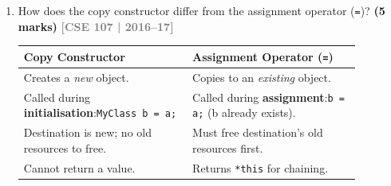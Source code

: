 \documentclass[12pt,a3paper]{article}
\newcommand{\yr}[1]{\hfill\textcolor{gray}{\small\textbf{[#1]}}}
\newcommand{\mk}[1]{\textcolor{orange!70!black}{\small\textbf{(#1 marks)}}}
\begin{document}
\begin{enumerate}
\begin{tcolorbox}[enhanced,breakable,ansbox,colback=cE!4,colframe=cE,
  boxrule=0.8pt,arc=5pt,
  title={\textbf{Answer --- myClass ob[] = \{-1, -2\} --- valid?}},
  fonttitle=\bfseries\color{white},colbacktitle=cE]
\textbf{Valid} --- if \texttt{myClass} has a single-\texttt{int}
constructor.

\begin{lstlisting}[language=C++]
class myClass {
    int val;
public:
    myClass(int v): val(v){}
    int get() const { return val; }
};

myClass ob[] = {-1, -2};
// Equivalent to: myClass ob[2] = {myClass(-1), myClass(-2)};
// ob[0].get() = -1,  ob[1].get() = -2
\end{lstlisting}

Each element in the initialiser list is implicitly converted to a
\texttt{myClass} object using the single-\texttt{int} constructor.
If the constructor is \texttt{explicit} or does not exist, this is
a compile error.

\end{tcolorbox}


\item How does the copy constructor differ from the assignment operator (\texttt{=})? \mk{5}
\yr{CSE 107 | 2016--17}


\begin{tcolorbox}[enhanced,breakable,ansbox,colback=cE!4,colframe=cE,
  boxrule=0.8pt,arc=5pt,
  title={\textbf{Answer --- Copy constructor vs assignment operator}},
  fonttitle=\bfseries\color{white},colbacktitle=cE]

\begin{center}
\small
\begin{tabular}{@{}p{0.44\linewidth}p{0.44\linewidth}@{}}
\toprule
\textbf{Copy Constructor} & \textbf{Assignment Operator (\texttt{=})} \\
\midrule
Creates a \emph{new} object. &
Copies to an \emph{existing} object. \\[3pt]
Called during \textbf{initialisation}:\newline\texttt{MyClass b = a;} &
Called during \textbf{assignment}:\newline\texttt{b = a;} (b already exists). \\[3pt]
Destination is new; no old resources to free. &
Must free destination's old resources first. \\[3pt]
Cannot return a value. &
Returns \texttt{*this} for chaining. \\
\bottomrule
\end{tabular}
\end{center}

\end{tcolorbox}



\end{enumerate}
\end{document}
